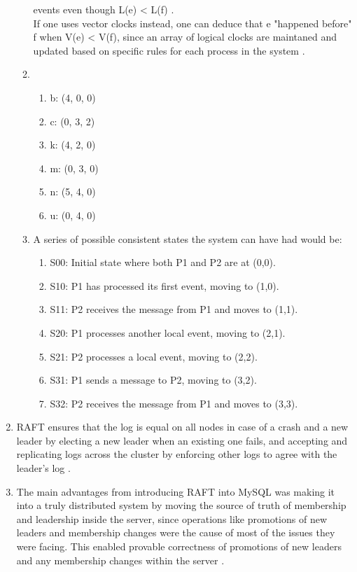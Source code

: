 \begin{enumerate}
\begin{enumerate}
            events even though L(e) < L(f) \autocite[p.~607]{couloris_2011}. 
            \\ If one uses vector clocks instead, one can deduce that e
            "happened before" f when V(e) < V(f), since an array of logical
            clocks are maintaned and updated based on specific rules for each 
            process in the system \autocite[p.~609]{couloris_2011}.
        \item 
            \begin{enumerate}
                \item b: (4, 0, 0)
                \item c: (0, 3, 2)
                \item k: (4, 2, 0)
                \item m: (0, 3, 0)
                \item n: (5, 4, 0)
                \item u: (0, 4, 0)
            \end{enumerate}
            \autocite[p.~610]{couloris_2011}
        \item A series of possible consistent states the system can have had 
            would be:
            \begin{enumerate}
                \item S00: Initial state where both P1 and P2 are at (0,0).
                \item S10: P1 has processed its first event, moving to (1,0).
                \item S11: P2 receives the message from P1 and moves to (1,1).
                \item S20: P1 processes another local event, moving to (2,1).
                \item S21: P2 processes a local event, moving to (2,2).
                \item S31: P1 sends a message to P2, moving to (3,2).
                \item S32: P2 receives the message from P1 and moves to (3,3).
            \end{enumerate}
            \autocite[p.~622]{couloris_2011}
    \end{enumerate}
    \item  RAFT ensures that the log is equal on all nodes in case of a crash 
        and a new leader by electing a new leader when an existing one fails,
        and accepting and replicating logs across the cluster by enforcing
        other logs to agree with the leader's log 
        \autocite[p.~307]{Ongaro_2014}. 
    \item The main advantages from introducing RAFT into MySQL was making it 
        into a truly distributed system by moving the source of truth of 
        membership and leadership inside the server, since operations like 
        promotions of new leaders and membership changes were the cause of most
        of the issues they were facing. This enabled provable correctness of 
        promotions of new leaders and any membership changes within the server
        \autocite{Rahut_2023}.
  \end{enumerate}

\newpage
\printbibliography

